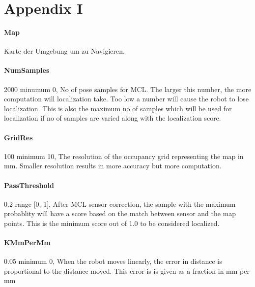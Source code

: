 \documentclass{article}
\begin{document}
\newpage


\appendix
\section{Appendix I}

\paragraph{Map}          Karte der Umgebung um zu Navigieren. 

\paragraph{NumSamples} 2000           minumum 0,  No of pose samples for MCL. The larger
                          this number, the more computation will localization
                          take. Too low a number will cause the robot to lose
                          localization. This is also the maximum no of samples
                          which will be used for localization if no of samples
                          are varied along with the localization score.

\paragraph{GridRes} 100               minimum 10,  The resolution of the occupancy grid
                          representing the map in mm. Smaller resolution
                          results in more accuracy but more computation.

\paragraph{PassThreshold} 0.2         range [0, 1],  After MCL sensor correction, the
                          sample with the maximum probablity will have a score
                          based on the match between sensor and the map
                          points. This is the minimum score out of 1.0 to be
                          considered localized.

\paragraph{KMmPerMm} 0.05             minimum 0,  When the robot moves linearly, the error
                          in distance is proportional to the distance moved.
                          This error is is given as a fraction in mm per mm
\end{document}
